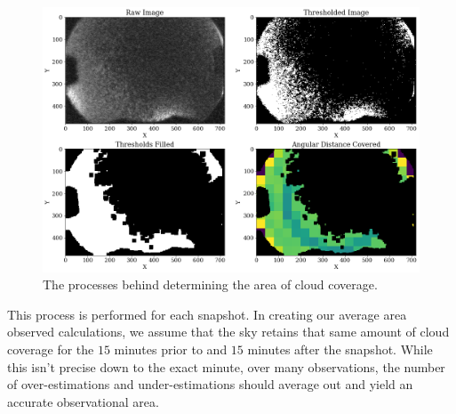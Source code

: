 \begin{figure}[ht!]
  \centering
  \includegraphics[scale=0.4]{images/Cloud_analysis.png}
  \caption{The processes behind determining the area of cloud coverage.}
  \label{colorclouds}
\end{figure}

This process is performed for each snapshot.
In creating our average area observed calculations, we assume that the sky retains that same amount of cloud coverage for the $15$ minutes prior to and $15$ minutes after the snapshot.
While this isn't precise down to the exact minute, over many observations, the number of over-estimations and under-estimations should average out and yield an accurate observational area.























 
